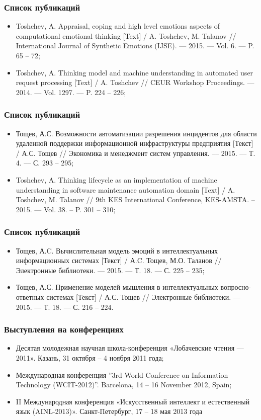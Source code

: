 \documentclass[14pt]{beamer}
\begin{document}
\begin{frame}
\frametitle{Список публикаций}

\begin{itemize}
	\item Toshchev, A. Appraisal, coping and high level emotions aspects of computational emotional thinking [Text] / A. Toshchev, M. Talanov // International Journal of Synthetic Emotions (IJSE). — 2015. — Vol. 6. — P. 65 – 72; 
	\item Toshchev, A. Thinking model and machine understanding in automated user request processing [Text] / A. Toshchev // CEUR Workshop Proceedings. — 2014. — Vol. 1297. — P. 224 – 226;
\end{itemize}
\end{frame}


\begin{frame}
\frametitle{Список публикаций}

\begin{itemize}
	\item Тощев, А.С. Возможности автоматизации разрешения инцидентов для области удаленной поддержки информационной инфраструктуры предприятия [Текст] / А.С. Тощев // Экономика и менеджмент систем управления. –– 2015. –– Т. 4. –– С. 293 – 295;
	\item Toshchev, A. Thinking lifecycle as an implementation of machine understanding in software maintenance automation domain [Text] / A. Toshchev, M. Talanov // 9th KES International Conference, KES-AMSTA. -- 2015. — Vol. 38. -- P. 301 – 310;
\end{itemize}
\end{frame}

\begin{frame}
\frametitle{Список публикаций}

\begin{itemize}
	\item Тощев, А.C. Вычислительная модель эмоций в интеллектуальных информационных системах [Текст] / А.C. Тощев, М.О. Таланов // Электронные библиотеки. –– 2015. –– Т. 18. –– С. 225 – 235;
	\item Тощев, А.С. Применение моделей мышления в интеллектуальных вопросно-ответных системах [Текст] / А.С. Тощев // Электронные библиотеки. –– 2015. –– Т. 18. –– С. 216 – 224.
\end{itemize}
\end{frame}


\begin{frame}
\frametitle{Выступления на конференциях}

\begin{itemize}
	\item Десятая молодежная научная школа-конференция «Лобачевские чтения —2011». Казань, 31 октября – 4 ноября 2011 года;
	\item Международная конференция ”3rd World Conference on Information Technology (WCIT-2012)”. Barcelona, 14 – 16 November 2012, Spain;
	\item II Международная конференция «Искусственный интеллект и естественный язык (AINL-2013)». Санкт-Петербург, 17 – 18 мая 2013 года
	
	
\end{itemize}
\end{frame}
\end{document}
